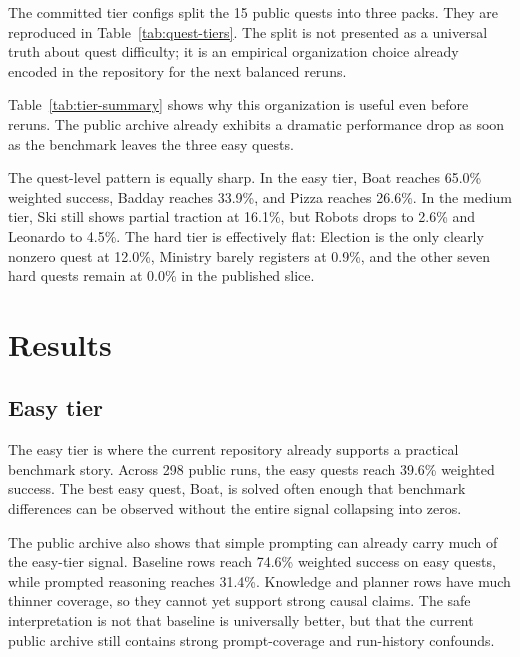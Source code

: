 \documentclass[11pt]{article}
\begin{document}
The committed tier configs split the 15 public quests into three packs. They are reproduced in Table~\ref{tab:quest-tiers}. The split is not presented as a universal truth about quest difficulty; it is an empirical organization choice already encoded in the repository for the next balanced reruns.

\begin{table}[t]
  \centering
  \caption{Quest packs used in this draft.}
  \label{tab:quest-tiers}
  
\end{table}

Table~\ref{tab:tier-summary} shows why this organization is useful even before reruns. The public archive already exhibits a dramatic performance drop as soon as the benchmark leaves the three easy quests.

\begin{table}[t]
  \centering
  \caption{Weighted success on the published six-model archive by tier.}
  \label{tab:tier-summary}
  
\end{table}

The quest-level pattern is equally sharp. In the easy tier, Boat reaches 65.0\% weighted success, Badday reaches 33.9\%, and Pizza reaches 26.6\%. In the medium tier, Ski still shows partial traction at 16.1\%, but Robots drops to 2.6\% and Leonardo to 4.5\%. The hard tier is effectively flat: Election is the only clearly nonzero quest at 12.0\%, Ministry barely registers at 0.9\%, and the other seven hard quests remain at 0.0\% in the published slice.

\section{Results}

\subsection{Easy tier}

The easy tier is where the current repository already supports a practical benchmark story. Across 298 public runs, the easy quests reach 39.6\% weighted success. The best easy quest, Boat, is solved often enough that benchmark differences can be observed without the entire signal collapsing into zeros.

The public archive also shows that simple prompting can already carry much of the easy-tier signal. Baseline rows reach 74.6\% weighted success on easy quests, while prompted reasoning reaches 31.4\%. Knowledge and planner rows have much thinner coverage, so they cannot yet support strong causal claims. The safe interpretation is not that baseline is universally better, but that the current public archive still contains strong prompt-coverage and run-history confounds.
\end{document}
